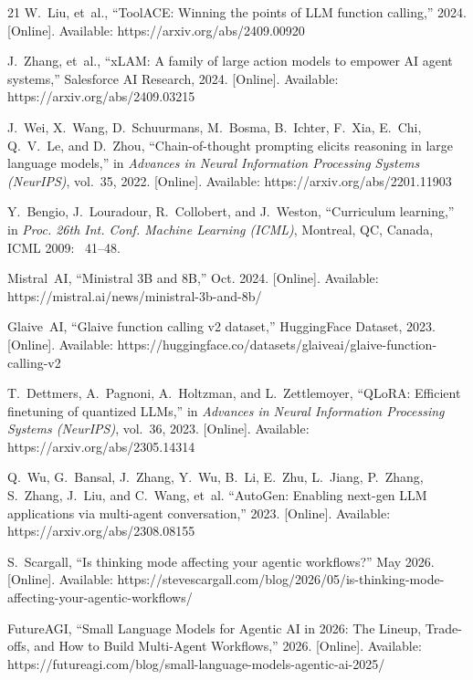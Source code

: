 \documentclass[conference]{IEEEtran}
\begin{document}
\begin{thebibliography}{21}
W.~Liu, et~al.,
``ToolACE: Winning the points of LLM function calling,''
2024.
[Online]. Available: https://arxiv.org/abs/2409.00920

J.~Zhang, et~al.,
``xLAM: A family of large action models to empower AI agent systems,''
Salesforce AI Research, 2024.
[Online]. Available: https://arxiv.org/abs/2409.03215

J.~Wei, X.~Wang, D.~Schuurmans, M.~Bosma, B.~Ichter, F.~Xia, E.~Chi, Q.~V.~Le, and D.~Zhou,
``Chain-of-thought prompting elicits reasoning in large language models,''
in \emph{Advances in Neural Information Processing Systems (NeurIPS)}, vol.~35, 2022.
[Online]. Available: https://arxiv.org/abs/2201.11903

Y.~Bengio, J.~Louradour, R.~Collobert, and J.~Weston,
``Curriculum learning,''
in \emph{Proc. 26th Int. Conf. Machine Learning (ICML)}, Montreal, QC, Canada, ICML 2009: ~41--48.

Mistral~AI,
``Ministral 3B and 8B,'' Oct. 2024.
[Online]. Available: https://mistral.ai/news/ministral-3b-and-8b/

Glaive~AI,
``Glaive function calling v2 dataset,''
HuggingFace Dataset, 2023.
[Online]. Available: https://huggingface.co/datasets/glaiveai/glaive-function-calling-v2

T.~Dettmers, A.~Pagnoni, A.~Holtzman, and L.~Zettlemoyer,
``QLoRA: Efficient finetuning of quantized LLMs,''
in \emph{Advances in Neural Information Processing Systems (NeurIPS)}, vol.~36, 2023.
[Online]. Available: https://arxiv.org/abs/2305.14314

Q.~Wu, G.~Bansal, J.~Zhang, Y.~Wu, B.~Li, E.~Zhu, L.~Jiang, P.~Zhang, S.~Zhang, J.~Liu, and C.~Wang, et~al.
``AutoGen: Enabling next-gen LLM applications via multi-agent conversation,''
2023.
[Online]. Available: https://arxiv.org/abs/2308.08155

S.~Scargall,
``Is thinking mode affecting your agentic workflows?'' May 2026.
[Online]. Available: https://stevescargall.com/blog/2026/05/is-thinking-mode-affecting-your-agentic-workflows/

FutureAGI,
``Small Language Models for Agentic AI in 2026: The Lineup, Trade-offs, and How to Build Multi-Agent Workflows,'' 2026.
[Online]. Available: https://futureagi.com/blog/small-language-models-agentic-ai-2025/

\end{thebibliography}
\end{document}
